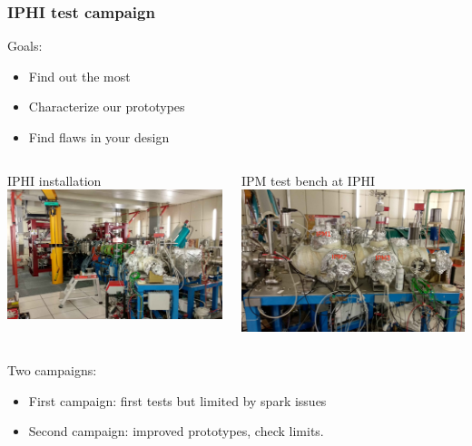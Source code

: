 \begin{frame}[t]
  \frametitle{IPHI test campaign}
  \begin{block}{Goals:}
    \begin{itemize}
      \item Find out the most
      \item Characterize our prototypes
      \item Find flaws in your design
    \end{itemize}
  \end{block}
  \begin{columns}[T]
    \begin{column}{0.45\textwidth}
      \centering
      IPHI installation
      \includegraphics[width=1\textwidth]{04_Test/fig/fig000_IPHI_tb1.jpg}
    \end{column}
    \begin{column}{0.45\textwidth}
      \centering
      IPM test bench at IPHI
      \includegraphics[width=1\textwidth]{04_Test/fig/fig000_IPHI_tb2.jpg}
    \end{column}
  \end{columns}
  \begin{block}{Two campaigns:}
    \begin{itemize}
      \item First campaign: first tests but limited by spark issues
      \item Second campaign:  improved prototypes, check limits.
    \end{itemize}
  \end{block}


\end{frame}

